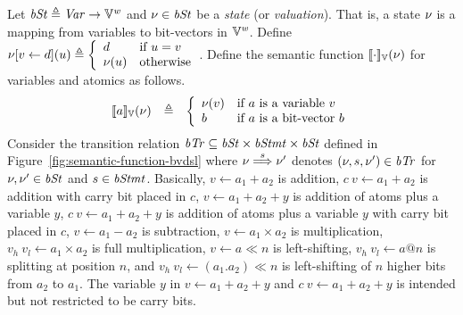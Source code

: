 Let $\mathit{bSt} \triangleq \mathit{Var} \rightarrow \mathbb{V}^{\mathit{w}}$ and $\nu \in \mathit{bSt}$ be a \emph{state} (or \emph{valuation}).
That is, a {state} $\nu$ is a mapping from variables to bit-vectors in $\mathbb{V}^{\mathit{w}}$.
Define
$
\nu{[}{v} \leftarrow {d}{]}(u) \triangleq
\left\{
   \begin{array}{ll}
     d & \textmd{if $u = v$}\\
     \nu(u) & \textmd{otherwise}
   \end{array}
\right.
$.
Define the semantic function $[\![{\cdot}]\!]_{\mathbb{V}}(\nu)$ for variables and atomics as follows.
\[
\begin{array}{rcl}
[\![{a}]\!]_{\mathbb{V}}(\nu) & \triangleq & \left\{
  \begin{array}{ll}
  \nu(v) & \textmd{if $a$ is a variable $v$} \\
  b & \textmd{if $a$ is a bit-vector $b$} \\
  \end{array}
  \right. \\
\end{array}
\]
Consider the transition relation $\mathit{bTr} \subseteq \mathit{bSt} \times \mathit{bStmt} \times \mathit{bSt}$ defined in Figure~\ref{fig:semantic-function-bvdsl} where
$\nu \overset{s}{\Longrightarrow} \nu'$ denotes $(\nu, s, \nu') \in \mathit{bTr}$
for $\nu, \nu' \in \mathit{bSt}$ and $s \in \mathit{bStmt}$.
Basically, $v \leftarrow a_1 + a_2$ is addition, $c\ v \leftarrow a_1 + a_2$ is addition with carry bit placed in $c$, $v \leftarrow a_1 + a_2 + y$ is addition of atoms plus a variable $y$, $c\ v \leftarrow a_1 + a_2 + y$ is addition of atoms plus a variable $y$ with carry bit placed in $c$, $v \leftarrow a_1 - a_2$ is subtraction, $v \leftarrow a_1 \times a_2$ is multiplication, $v_h\ v_l \leftarrow a_1 \times a_2$ is full multiplication, $v \leftarrow a \ll n$ is left-shifting, $v_h\ v_l \leftarrow a @ n$ is splitting at position $n$, and $v_h\ v_l \leftarrow (a_1 . a_2) \ll n$ is left-shifting of $n$ higher bits from $a_2$ to $a_1$.
The variable $y$ in $v \leftarrow a_1 + a_2 + y$ and $c\ v \leftarrow a_1 + a_2 + y$ is intended but not restricted to be carry bits.


